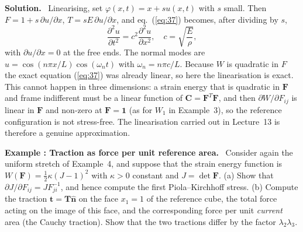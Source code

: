 \documentclass[a4paper,12pt]{paper}
\newcounter{example}
\renewenvironment{example}[1]{%
  \refstepcounter{example}%
  \begin{mdframed}[linewidth=1pt,innertopmargin=6pt,innerbottommargin=6pt]%
  \noindent\textbf{Example \theexample: #1.}\ }{%
  \end{mdframed}}
\newenvironment{solution}{\par\noindent\textbf{Solution.}\ }{\par\medskip}
\begin{document}
\begin{solution}
Linearising, set $\varphi(x,t)=x+su(x,t)$ with $s$ small. Then $F=1+s\,\partial u/\partial x$,
$T=sE\,\partial u/\partial x$, and eq.~(\ref{eq:37}) becomes, after dividing by $s$,
\begin{equation}
\frac{\partial^{2}u}{\partial t^{2}}=c^{2}\frac{\partial^{2}u}{\partial x^{2}},\quad c=\sqrt{\frac{E}{\rho}},
\label{eq:39}
\end{equation}
with $\partial u/\partial x=0$ at the free ends. The normal modes are
$u=\cos(n\pi x/L)\cos(\omega_{n}t)$ with $\omega_{n}=n\pi c/L$. Because $W$ is quadratic in
$F$ the exact equation (\ref{eq:37}) was already linear, so here the linearisation is exact.
This cannot happen in three dimensions: a strain energy that is quadratic in $\mathbf{F}$ and
frame indifferent must be a linear function of $\mathbf{C}=\mathbf{F}^{T}\mathbf{F}$, and then
$\partial W/\partial F_{ij}$ is linear in $\mathbf{F}$ and non-zero at $\mathbf{F}=\mathbf{1}$
(as for $W_{1}$ in Example~3), so the reference configuration is not stress-free. The
linearisation carried out in Lecture~13 is therefore a genuine approximation.
\end{solution}

\begin{example}{Traction as force per unit reference area}
Consider again the uniform stretch of Example~4, and suppose that the strain energy function
is $W(\mathbf{F})=\tfrac{1}{2}\kappa(J-1)^{2}$ with $\kappa>0$ constant and
$J=\det\mathbf{F}$. (a) Show that $\partial J/\partial F_{ij}=JF^{-1}_{ji}$, and hence compute
the first Piola--Kirchhoff stress. (b) Compute the traction $\mathbf{t}=\mathbf{T}\hat{\mathbf{n}}$
on the face $x_{1}=1$ of the reference cube, the total force acting on the image of this face,
and the corresponding force per unit \emph{current} area (the Cauchy traction). Show that the
two tractions differ by the factor $\lambda_{2}\lambda_{3}$.
\end{example}
\end{document}
